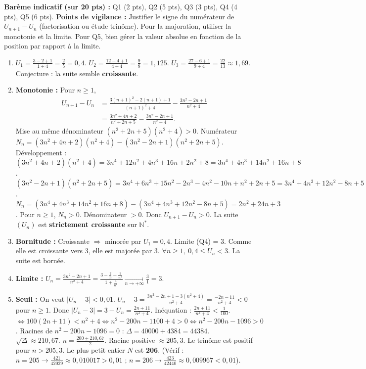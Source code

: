 \documentclass[11pt]{article}
\begin{document}
\begin{corrige}
\textbf{Barème indicatif (sur 20 pts) :} Q1 (2 pts), Q2 (5 pts), Q3 (3 pts), Q4 (4 pts), Q5 (6 pts).
\textbf{Points de vigilance :} Justifier le signe du numérateur de $U_{n+1}-U_n$ (factorisation ou étude trinôme). Pour la majoration, utiliser la monotonie et la limite. Pour Q5, bien gérer la valeur absolue en fonction de la position par rapport à la limite.
\begin{enumerate}
    \item $U_1 = \frac{3-2+1}{1+4} = \frac{2}{5} = 0,4$.
    $U_2 = \frac{12-4+1}{4+4} = \frac{9}{8} = 1,125$.
    $U_3 = \frac{27-6+1}{9+4} = \frac{22}{13} \approx 1,69$.
    Conjecture : la suite semble \textbf{croissante}.
    \item \textbf{Monotonie :} Pour $n \ge 1$,
    \begin{align*}
    U_{n+1} - U_n &= \frac{3(n+1)^2 - 2(n+1) + 1}{(n+1)^2 + 4} - \frac{3n^2 - 2n + 1}{n^2 + 4} \\
    &= \frac{3n^2+4n+2}{n^2+2n+5} - \frac{3n^2-2n+1}{n^2+4}.
    \end{align*}
    Mise au même dénominateur $(n^2+2n+5)(n^2+4) > 0$.
    Numérateur $N_n = (3n^2+4n+2)(n^2+4) - (3n^2-2n+1)(n^2+2n+5)$.
    Développement :
    $(3n^2+4n+2)(n^2+4) = 3n^4 + 12n^2 + 4n^3 + 16n + 2n^2 + 8 = 3n^4 + 4n^3 + 14n^2 + 16n + 8$.
    $(3n^2-2n+1)(n^2+2n+5) = 3n^4 + 6n^3 + 15n^2 - 2n^3 - 4n^2 - 10n + n^2 + 2n + 5 = 3n^4 + 4n^3 + 12n^2 - 8n + 5$.
    $N_n = (3n^4 + 4n^3 + 14n^2 + 16n + 8) - (3n^4 + 4n^3 + 12n^2 - 8n + 5) = 2n^2 + 24n + 3$.
    Pour $n \ge 1$, $N_n > 0$. Dénominateur $> 0$.
    Donc $U_{n+1} - U_n > 0$. La suite $(U_n)$ est \textbf{strictement croissante} sur $\mathbb{N}^*$.
    \item \textbf{Bornitude :}
    Croissante $\Rightarrow$ minorée par $U_1 = 0,4$.
    Limite (Q4) = 3. Comme elle est croissante vers 3, elle est majorée par 3.
    $\forall n \ge 1,\ 0,4 \le U_n < 3$. La suite est bornée.
    \item \textbf{Limite :}
    $U_n = \frac{3n^2 - 2n + 1}{n^2 + 4} = \frac{3 - \frac{2}{n} + \frac{1}{n^2}}{1 + \frac{4}{n^2}} \xrightarrow[n\to+\infty]{} \frac{3}{1} = 3$.
    \item \textbf{Seuil :} On veut $|U_n - 3| < 0,01$.
    $U_n - 3 = \frac{3n^2-2n+1 - 3(n^2+4)}{n^2+4} = \frac{-2n - 11}{n^2+4} < 0$ pour $n\ge 1$.
    Donc $|U_n - 3| = 3 - U_n = \frac{2n+11}{n^2+4}$.
    Inéquation : $\frac{2n+11}{n^2+4} < \frac{1}{100}$.
    $\iff 100(2n+11) < n^2 + 4 \iff n^2 - 200n - 1100 + 4 > 0 \iff n^2 - 200n - 1096 > 0$.
    Racines de $n^2 - 200n - 1096 = 0$ : $\Delta = 40000 + 4384 = 44384$. $\sqrt{\Delta} \approx 210,67$.
    $n = \frac{200 \pm 210,67}{2}$. Racine positive $\approx 205,3$.
    Le trinôme est positif pour $n > 205,3$.
    Le plus petit entier $N$ est \textbf{206}.
    (Vérif : $n=205 \to \frac{421}{42029} \approx 0,010017 > 0,01$ ; $n=206 \to \frac{423}{42440} \approx 0,009967 < 0,01$).
\end{enumerate}
\end{corrige}
\end{document}
